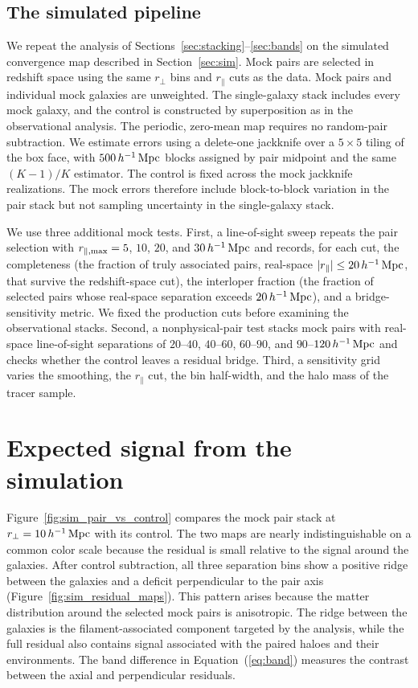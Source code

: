 \subsection{The simulated pipeline}
\label{sec:sim_pipeline}

We repeat the analysis of Sections~\ref{sec:stacking}--\ref{sec:bands} on the
simulated convergence map described in Section~\ref{sec:sim}. Mock pairs are
selected in redshift space using the same $r_{\perp}$ bins and
$r_{\parallel}$ cuts as the data. Mock pairs and individual mock galaxies
are unweighted. The single-galaxy stack includes every mock galaxy, and the
control is constructed by superposition as in the observational analysis.
The periodic, zero-mean map requires no random-pair subtraction. We estimate
errors using a delete-one jackknife over a $5\times5$ tiling of the box face,
with $500\,h^{-1}\,{\rm Mpc}$ blocks assigned by pair midpoint and the same $(K-1)/K$
estimator. The control is fixed across the mock jackknife realizations. The
mock errors therefore include block-to-block variation in the pair stack but
not sampling uncertainty in the single-galaxy stack.

We use three additional mock tests. First, a line-of-sight sweep repeats
the pair selection with $r_{\parallel,{\rm max}}=5$, $10$, $20$, and
$30\,h^{-1}\,{\rm Mpc}$ and records, for each cut, the completeness (the fraction of
truly associated pairs, real-space $|r_{\parallel}|\leq20\,h^{-1}\,{\rm Mpc}$, that
survive the redshift-space cut), the interloper fraction (the fraction of
selected pairs whose real-space separation exceeds $20\,h^{-1}\,{\rm Mpc}$), and a
bridge-sensitivity metric. We fixed the production cuts before examining the
observational stacks.
Second, a nonphysical-pair test stacks mock pairs with real-space
line-of-sight separations of $20$--$40$, $40$--$60$, $60$--$90$, and
$90$--$120\,h^{-1}\,{\rm Mpc}$ and checks whether the control leaves a residual bridge.
Third, a sensitivity grid varies the smoothing, the $r_{\parallel}$ cut, the
bin half-width, and the halo mass of the tracer sample.

\section{Expected signal from the simulation}
\label{sec:sim_expect}

Figure~\ref{fig:sim_pair_vs_control} compares the mock pair stack at
$r_{\perp}=10\,h^{-1}\,{\rm Mpc}$ with its control. The two maps are nearly
indistinguishable on a common color scale because the residual is small
relative to the signal around the galaxies. After control subtraction, all
three separation bins show a positive ridge between the galaxies and a
deficit perpendicular to the pair axis (Figure~\ref{fig:sim_residual_maps}).
This pattern arises because the matter distribution around the selected mock
pairs is anisotropic. The ridge between the galaxies is the
filament-associated component targeted by the analysis, while the full
residual also contains signal associated with the paired haloes and their
environments. The band difference in Equation~(\ref{eq:band}) measures the
contrast between the axial and perpendicular residuals.


